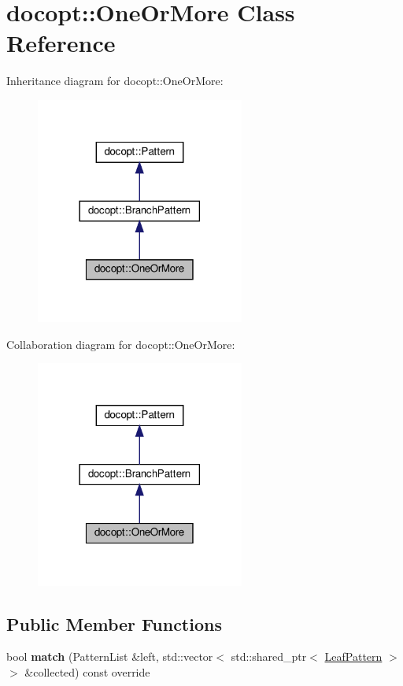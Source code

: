 \hypertarget{classdocopt_1_1OneOrMore}{}\section{docopt\+:\+:One\+Or\+More Class Reference}
\label{classdocopt_1_1OneOrMore}


Inheritance diagram for docopt\+:\+:One\+Or\+More\+:
\nopagebreak
\begin{figure}[H]
\begin{center}
\leavevmode
\includegraphics[width=194pt]{classdocopt_1_1OneOrMore__inherit__graph}
\end{center}
\end{figure}


Collaboration diagram for docopt\+:\+:One\+Or\+More\+:
\nopagebreak
\begin{figure}[H]
\begin{center}
\leavevmode
\includegraphics[width=194pt]{classdocopt_1_1OneOrMore__coll__graph}
\end{center}
\end{figure}
\subsection*{Public Member Functions}
\begin{DoxyCompactItemize}
\item 
\mbox{\label{classdocopt_1_1OneOrMore_a9a381cacffb24af701a9e9283464fc23}} 
bool {\bfseries match} (Pattern\+List \&left, std\+::vector$<$ std\+::shared\+\_\+ptr$<$ \hyperlink{classdocopt_1_1LeafPattern}{Leaf\+Pattern} $>$$>$ \&collected) const override
\end{DoxyCompactItemize}
